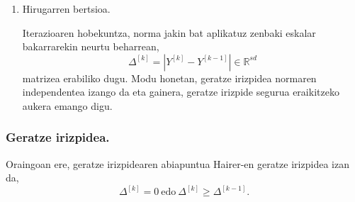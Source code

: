\begin{enumerate}
\item Hirugarren bertsioa.

Iterazioaren hobekuntza, norma jakin bat aplikatuz zenbaki eskalar bakarrarekin neurtu beharrean,
\begin{equation}
\label{eq:DD3}
\Delta^{[k]}=|Y^{[k]}-Y^{[k-1]}| \in \mathbb{R}^{sd}
\end{equation}
matrizea erabiliko dugu. Modu honetan, geratze irizpidea normaren independentea izango da eta gainera, geratze irizpide segurua eraikitzeko aukera emango digu.

\end{enumerate} 


\subsubsection*{Geratze irizpidea.}

Oraingoan ere, geratze irizpidearen abiapuntua Hairer-en geratze irizpidea izan da,
\begin{equation*}
\Delta ^{[k]}=0 \ \text{edo} \ \Delta^{[k]} \geqslant \Delta^{[k-1]}.
\end{equation*}

